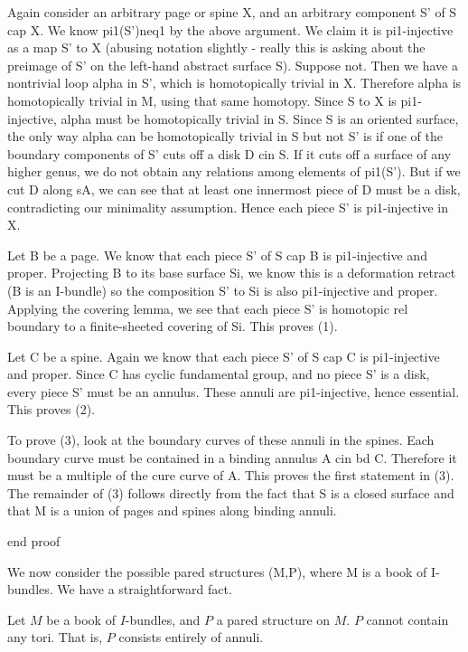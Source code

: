 Again consider an arbitrary page or spine X, and an arbitrary component S' of
S cap X.  We know pi1(S')neq1 by the above argument. We claim it is
pi1-injective as a map S' to X (abusing notation slightly - really this is
asking about the preimage of S' on the left-hand abstract surface S). Suppose
not. Then we have a nontrivial loop alpha in S', which is homotopically trivial
in X.  Therefore alpha is homotopically trivial in M, using that same homotopy.
Since S to X is pi1-injective, alpha must be homotopically trivial in S. Since
S is an oriented surface, the only way alpha can be homotopically trivial in
S but not S' is if one of the boundary components of S' cuts off a disk D cin
S. If it cuts off a surface of any higher genus, we do not obtain any relations
among elements of pi1(S'). But if we cut D along sA, we can see that at least
one innermost piece of D must be a disk, contradicting our minimality
assumption. Hence each piece S' is pi1-injective in X.

Let B be a page. We know that each piece S' of S cap B is pi1-injective and
proper. Projecting B to its base surface Si, we know this is a deformation
retract (B is an I-bundle) so the composition S' to Si is also pi1-injective
and proper. Applying the covering lemma, we see that each piece S' is homotopic
rel boundary to a finite-sheeted covering of Si. This proves (1).

Let C be a spine. Again we know that each piece S' of S cap C is pi1-injective
and proper. Since C has cyclic fundamental group, and no piece S' is a disk,
every piece S' must be an annulus. These annuli are pi1-injective, hence
essential. This proves (2).

To prove (3), look at the boundary curves of these annuli in the spines. Each
boundary curve must be contained in a binding annulus A cin bd C. Therefore it
must be a multiple of the cure curve of A. This proves the first statement in
(3). The remainder of (3) follows directly from the fact that S is a closed
surface and that M is a union of pages and spines along binding annuli.

end proof

We now consider the possible pared structures (M,P), where M is a book of
I-bundles. We have a straightforward fact.

\begin{prop}

Let $M$ be a book of $I$-bundles, and $P$ a pared structure on $M$. $P$ cannot
contain any tori.  That is, $P$ consists entirely of annuli.

\end{prop}

